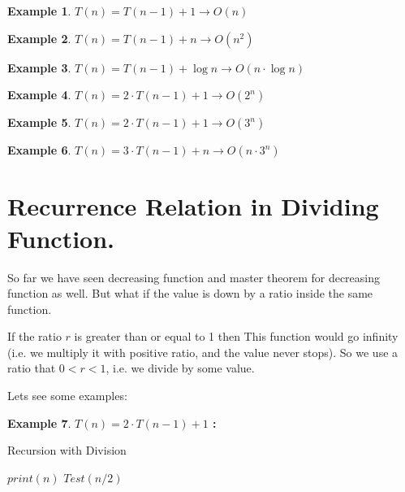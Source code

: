 \documentclass[]{article}
\theoremstyle{plain}
\theoremstyle{definition}
\newtheorem{lem}{Example}[thm]
\begin{document}
\begin{lem}
$T(n) = T(n - 1) + 1 \rightarrow O(n)$
\end{lem}

\begin{lem}
    $T(n) = T(n - 1) + n \rightarrow O(n^2)$
\end{lem}

\begin{lem}
    $T(n) = T(n - 1) + \log{n} \rightarrow O(n\cdot \log{n})$
\end{lem}

\begin{lem}
    $T(n) = 2\cdot T(n - 1) + 1 \rightarrow O(2^n)$
\end{lem}

\begin{lem}
    $T(n) = 2\cdot T(n - 1) + 1 \rightarrow O(3^n)$
\end{lem}
\begin{lem}
    $T(n) = 3\cdot T(n - 1) + n \rightarrow O(n\cdot 3^n)$
\end{lem}

\section{Recurrence Relation in Dividing Function.}
So far we have seen decreasing function and master theorem for decreasing function as well. But what if the value is down by a ratio inside the same function. 

If the ratio $r$ is greater than or equal to 1 then This function would go infinity (i.e. we multiply it with positive ratio, and the value never stops). So we use a ratio that $0 < r < 1$, i.e. we divide by some value.

Lets see some examples:
\begin{lem}
\textbf{$T(n) = 2 \cdot T(n -1) + 1$ :}
\begin{algorithm}[H]
    \caption{Recursion with Division}
    \label{SimpleDivisionRecursion}
    \begin{algorithmic}
         
            \State$print(n)$ 
            \EndFor
            \State$Test(n/2)$  
        \EndIf 
        \EndProcedure
    \end{algorithmic}
\end{algorithm}
\end{lem}
\end{document}

